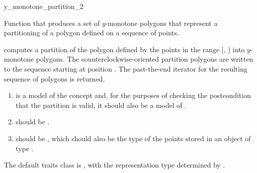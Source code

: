 \begin{ccRefFunction}{y_monotone_partition_2}

\ccDefinition

Function that produces a set of $y$-monotone polygons that 
represent a partitioning of a polygon defined on a sequence of points.


{
computes a partition of the polygon defined 
by the points in the range [, ) into $y$-monotone 
polygons. The counterclockwise-oriented partition polygons are written to
the sequence starting at position .  The past-the-end iterator for 
the resulting sequence of polygons is returned.
\ccPrecond{The points in the range [\ccc{first}, \ccc{beyond}) define a
simple, counterclockwise-oriented polygon.}
}

\begin{enumerate}
    \item {} is a model of the concept
          and, for the purposes
          of checking the postcondition that the partition is valid, it should 
          also be a model of .
    \item {} should be 
          .
    \item {} should be ,
          which should also be the type of the points stored in an object
          of type .
\end{enumerate}

The default traits class  is ,
with the representation type determined by .

\ccSeeAlso
{} \\
 \\
 \\
 \\


\end{ccRefFunction}
